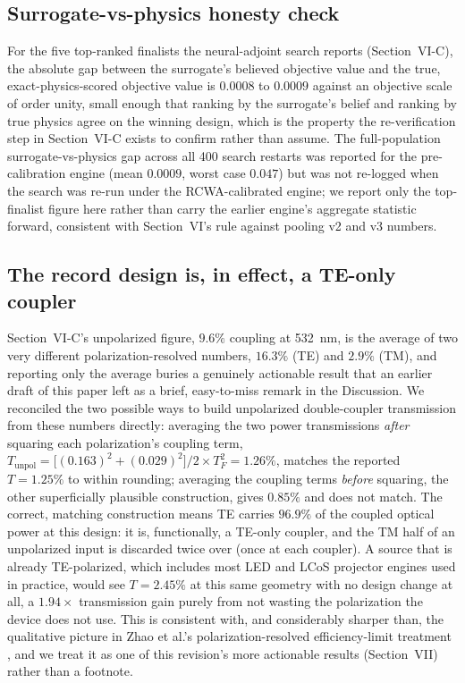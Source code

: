 \documentclass[10pt,twocolumn]{article}
\begin{document}
\subsection{Surrogate-vs-physics honesty check}
For the five top-ranked finalists the neural-adjoint search reports
(Section~VI-C), the absolute gap between the surrogate's believed
objective value and the true, exact-physics-scored objective value is
$0.0008$ to $0.0009$ against an objective scale of order unity, small
enough that ranking by the surrogate's belief and ranking by true physics
agree on the winning design, which is the property the re-verification
step in Section~VI-C exists to confirm rather than assume. The
full-population surrogate-vs-physics gap across all 400 search restarts
was reported for the pre-calibration engine (mean $0.0009$, worst case
$0.047$) but was not re-logged when the search was re-run under the
RCWA-calibrated engine; we report only the top-finalist figure here rather
than carry the earlier engine's aggregate statistic forward, consistent
with Section~VI's rule against pooling v2 and v3 numbers.

\subsection{The record design is, in effect, a TE-only coupler}
Section~VI-C's unpolarized figure, $9.6\%$ coupling at 532~nm, is the
average of two very different polarization-resolved numbers, $16.3\%$
(TE) and $2.9\%$ (TM), and reporting only the average buries a genuinely
actionable result that an earlier draft of this paper left as a brief,
easy-to-miss remark in the Discussion. We reconciled the two possible ways
to build unpolarized double-coupler transmission from these numbers
directly: averaging the two power transmissions \emph{after} squaring each
polarization's coupling term, $T_{\mathrm{unpol}}=\big[(0.163)^2+(0.029)^2\big]/2
\times T_F^2 = 1.26\%$, matches the reported $T=1.25\%$ to within rounding;
averaging the coupling terms \emph{before} squaring, the other
superficially plausible construction, gives $0.85\%$ and does not match.
The correct, matching construction means TE carries $96.9\%$ of the
coupled optical power at this design: it is, functionally, a TE-only
coupler, and the TM half of an unpolarized input is discarded twice over
(once at each coupler). A source that is already TE-polarized, which
includes most LED and LCoS projector engines used in practice, would see
$T=2.45\%$ at this same geometry with no design change at all, a
$1.94\times$ transmission gain purely from not wasting the polarization
the device does not use. This is consistent with, and considerably sharper
than, the qualitative picture in Zhao et al.'s polarization-resolved
efficiency-limit treatment \cite{zhao2024}, and we treat it as one of this
revision's more actionable results (Section~VII) rather than a footnote.
\end{document}
